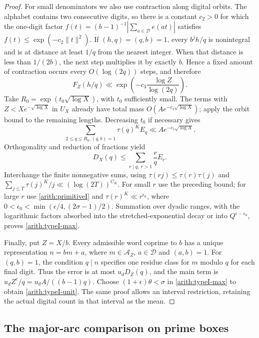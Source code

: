 \documentclass[11pt,a4paper]{article}
\theoremstyle{paperplain}
\numberwithin{equation}{section}
\begin{document}
\begin{proof}
For small denominators we also use contraction along digital orbits.
The alphabet contains two consecutive digits, so there is a constant
$c_2>0$ for which the one-digit factor
$f(t)=(b-1)^{-1}|\sum_{a\in\mathcal D}e(at)|$
satisfies $f(t)\le\exp(-c_2\|t\|^2)$.
If $(h,q)=(q,b)=1$, every $b^jh/q$ is nonintegral and is at distance
at least $1/q$ from the nearest integer. When that distance is less
than $1/(2b)$, the next step multiplies it by exactly $b$.
Hence a fixed amount of contraction occurs every $O(\log(2q))$ steps,
and therefore
\[
 F_Z(h/q)\ll\exp\left(-c_3\frac{\log Z}{\log(2q)}\right).
\]
Take $R_0=\exp(t_0\sqrt{\log X})$, with $t_0$ sufficiently small.
The terms with $Z<Xe^{-\sqrt{\log X}}$ in $U_X$ already have total
mass $O(Ae^{-c_4\sqrt{\log X}})$; apply the orbit bound to the remaining
lengths. Decreasing $t_0$ if necessary gives
\[
 \sum_{2\le q\le R_0,(q,b)=1}\tau(q)^K E_q
       \ll A e^{-c_5\sqrt{\log X}}.
\]
Orthogonality and reduction of fractions yield
\[
 D_X(q)\le\sum_{r\mid q,\ r>1}\frac rq E_r.
\]
Interchange the finite nonnegative sums, using
$\tau(rj)\le\tau(r)\tau(j)$ and
$\sum_{j\le T}\tau(j)^K/j\ll(\log(2T))^{C_K}$.
For small $r$ use the preceding bound; for large $r$ use
\eqref{arith:primitiveI} and $\tau(r)^K\ll r^{\epsilon_0}$, where
$0<\epsilon_0<\min(\epsilon/4,(2\sigma-1)/2)$.
Summation over dyadic ranges, with the logarithmic factors absorbed into
the stretched-exponential decay or into $Q^{\epsilon-\epsilon_0}$,
proves \eqref{arith:typeI-max}.

Finally, put $Z=X/b$. Every admissible word coprime to $b$ has a unique
representation $n=bm+a$, where $m\in\mathcal A_Z$, $a\in\mathcal D$ and
$(a,b)=1$. For $(q,b)=1$, the condition $q\mid n$ specifies one residue
class for $m$ modulo $q$ for each final digit.
Thus the error is at most $u_dD_Z(q)$, and the main term is
$u_dZ^c/q=u_dA/((b-1)q)$.
Choose $(1+\epsilon)\theta<\sigma$ in \eqref{arith:typeI-max} to obtain
\eqref{arith:typeI-unit}. The same proof allows an interval restriction,
retaining the actual digital count in that interval as the mean.
\end{proof}

\subsection{The major-arc comparison on prime boxes}
\end{document}
